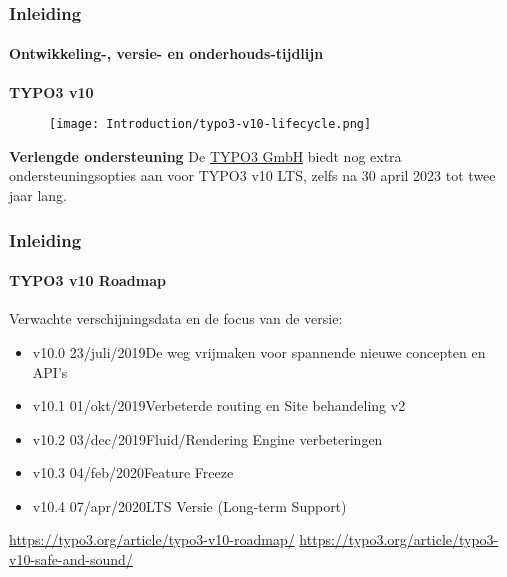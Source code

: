 
\begin{frame}[fragile]
	\frametitle{Inleiding}
	\framesubtitle{Ontwikkeling-, versie- en onderhouds-tijdlijn}

	\textbf{TYPO3 v10}

	\begin{figure}
		\texttt{[image: Introduction/typo3-v10-lifecycle.png]}
	\end{figure}

	\textbf{Verlengde ondersteuning}\newline
	\smaller
		De \href{https://typo3.com}{TYPO3 GmbH} biedt nog extra ondersteuningsopties aan
	    voor TYPO3 v10 LTS, zelfs na 30 april 2023 tot twee jaar lang.
	\normalsize

\end{frame}


\begin{frame}[fragile]
	\frametitle{Inleiding}
	\framesubtitle{TYPO3 v10 Roadmap}

	Verwachte verschijningsdata en de focus van de versie:

	\begin{itemize}

		\item v10.0 \tabto{1.1cm}23/juli/2019\tabto{3.4cm}De weg vrijmaken voor spannende nieuwe concepten en API's
		\item v10.1 \tabto{1.1cm}01/okt/2019\tabto{3.4cm}Verbeterde routing en Site behandeling v2
		\item
			\begingroup
				\color{typo3orange}
				v10.2 \tabto{1.1cm}03/dec/2019\tabto{3.4cm}Fluid/Rendering Engine verbeteringen
			\endgroup
		\item v10.3 \tabto{1.1cm}04/feb/2020\tabto{3.4cm}Feature Freeze
		\item v10.4 \tabto{1.1cm}07/apr/2020\tabto{3.4cm}LTS Versie (Long-term Support)

	\end{itemize}

	\smaller
		\url{https://typo3.org/article/typo3-v10-roadmap/}\newline
		\url{https://typo3.org/article/typo3-v10-safe-and-sound/}
	\normalsize

\end{frame}

